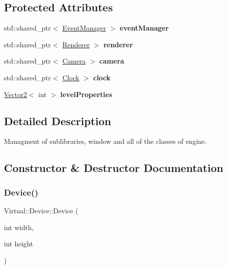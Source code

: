 \subsection*{Protected Attributes}
\begin{DoxyCompactItemize}
\item 
\hypertarget{class_virtual_1_1_device_aa1ea93335ccb046238b1fb61e1cb087f}{}\label{class_virtual_1_1_device_aa1ea93335ccb046238b1fb61e1cb087f} 
std\+::shared\+\_\+ptr$<$ \hyperlink{class_virtual_1_1_event_manager}{Event\+Manager} $>$ {\bfseries event\+Manager}
\item 
\hypertarget{class_virtual_1_1_device_a3c40ddcdd5514b6ceb8de171835aa522}{}\label{class_virtual_1_1_device_a3c40ddcdd5514b6ceb8de171835aa522} 
std\+::shared\+\_\+ptr$<$ \hyperlink{class_virtual_1_1_renderer}{Renderer} $>$ {\bfseries renderer}
\item 
\hypertarget{class_virtual_1_1_device_a34e3c67e5ed6f3aad78e69df09760079}{}\label{class_virtual_1_1_device_a34e3c67e5ed6f3aad78e69df09760079} 
std\+::shared\+\_\+ptr$<$ \hyperlink{class_virtual_1_1_camera}{Camera} $>$ {\bfseries camera}
\item 
\hypertarget{class_virtual_1_1_device_ae791d56234f12d666bc620d740690067}{}\label{class_virtual_1_1_device_ae791d56234f12d666bc620d740690067} 
std\+::shared\+\_\+ptr$<$ \hyperlink{class_virtual_1_1_clock}{Clock} $>$ {\bfseries clock}
\item 
\hypertarget{class_virtual_1_1_device_aa2bf96683fa3d4fec7b1db02e81caa0b}{}\label{class_virtual_1_1_device_aa2bf96683fa3d4fec7b1db02e81caa0b} 
\hyperlink{struct_virtual_1_1_vector2}{Vector2}$<$ int $>$ {\bfseries level\+Properties}
\end{DoxyCompactItemize}


\subsection{Detailed Description}
Managment of sublibraries, window and all of the classes of engine. 

\subsection{Constructor \& Destructor Documentation}
\hypertarget{class_virtual_1_1_device_a01750717800affee98304503b6e7394d}{}\label{class_virtual_1_1_device_a01750717800affee98304503b6e7394d} 
\subsubsection{\texorpdfstring{Device()}{Device()}}
{\footnotesize\ttfamily Virtual\+::\+Device\+::\+Device (\begin{DoxyParamCaption}\item[{int}]{width,  }\item[{int}]{height }\end{DoxyParamCaption})}



